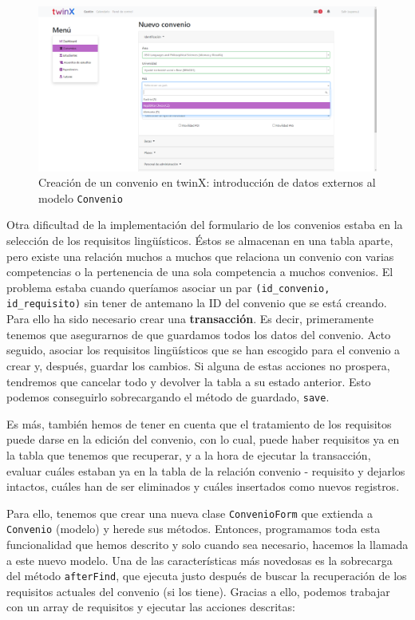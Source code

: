 \begin{figure}
	\centering
	\includegraphics[width=\linewidth]{img/Capturas de twinX/creacion_convenio_3}
	\caption[Creación de un convenio en twinX 3]{Creación de un convenio en twinX: introducción de datos externos al modelo \texttt{Convenio}}
	\label{fig:creacionconvenio3}
\end{figure}

Otra dificultad de la implementación del formulario de los convenios estaba en la selección de los requisitos lingüísticos. Éstos se almacenan en una tabla aparte, pero existe una relación muchos a muchos que relaciona un convenio con varias competencias o la pertenencia de una sola competencia a muchos convenios. El problema estaba cuando queríamos asociar un par \texttt{(id\_convenio, id\_requisito)} sin tener de antemano la ID del convenio que se está creando. Para ello ha sido necesario crear una \textbf{transacción}. Es decir, primeramente tenemos que asegurarnos de que guardamos todos los datos del convenio. Acto seguido, asociar los requisitos lingüísticos que se han escogido para el convenio a crear y, después, guardar los cambios. Si alguna de estas acciones no prospera, tendremos que cancelar todo y devolver la tabla a su estado anterior. Esto podemos conseguirlo sobrecargando el método de guardado, \texttt{save}.

Es más, también hemos de tener en cuenta que el tratamiento de los requisitos puede darse en la edición del convenio, con lo cual, puede haber requisitos ya en la tabla que tenemos que recuperar, y a la hora de ejecutar la transacción, evaluar cuáles estaban ya en la tabla de la relación convenio - requisito y dejarlos intactos, cuáles han de ser eliminados y cuáles insertados como nuevos registros.

Para ello, tenemos que crear una nueva clase \texttt{ConvenioForm} que extienda a \texttt{Convenio} (modelo) y herede sus métodos. Entonces, programamos toda esta funcionalidad que hemos descrito y solo cuando sea necesario, hacemos la llamada a este nuevo modelo. Una de las características más novedosas es la sobrecarga del método \texttt{afterFind}, que ejecuta justo después de buscar la recuperación de los requisitos actuales del convenio (si los tiene). Gracias a ello, podemos trabajar con un array de requisitos y ejecutar las acciones descritas:

